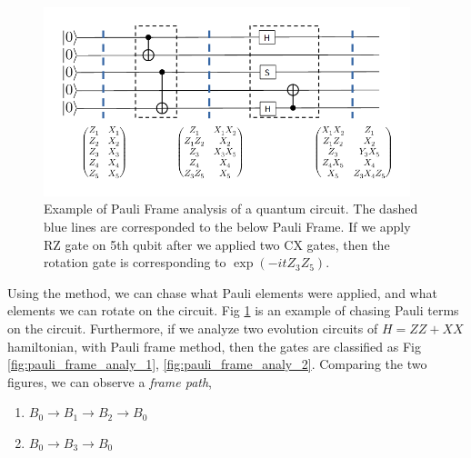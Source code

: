\documentclass[a4paper,12pt]{article}
\begin{document}
\begin{figure}
    \centering
    \includegraphics[width = 0.95\textwidth]{figures/Pauli Frame.png}
    \caption{
        Example of Pauli Frame analysis of a quantum circuit. 
        The dashed blue lines are corresponded to the below Pauli Frame.
        If we apply RZ gate on 5th qubit after we applied two CX gates,
        then the rotation gate is corresponding to $\exp(-i t Z_3Z_5)$.
    }
    \label{fig:Pauli Frame}
\end{figure}

Using the method, we can chase what Pauli elements were applied, 
and what elements we can rotate on the circuit.
Fig \ref{fig:Pauli Frame} is an example of chasing Pauli terms on the circuit.
Furthermore, if we analyze two evolution circuits of $H = ZZ + XX$ hamiltonian,
with Pauli frame method, then the gates are classified as Fig \ref{fig:pauli_frame_analy_1}, \ref{fig:pauli_frame_analy_2}.
Comparing the two figures, we can observe a \textit{frame path},

\begin{enumerate}
    \item $B_0 \rightarrow B_1 \rightarrow B_2 \rightarrow B_0$
    \item $B_0 \rightarrow B_3 \rightarrow B_0$
\end{enumerate}
\end{document}
